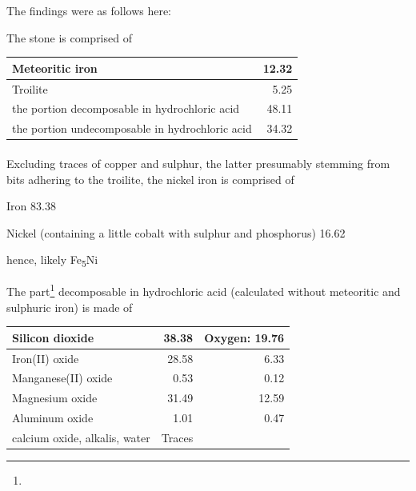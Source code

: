 \documentclass[a4paper, 12pt, oneside]{article}
\begin{document}
The findings were as follows here:

The stone is comprised of
\begin{center}
    \begin{tabular}{ |l|r| } 
    \hline
    Meteoritic iron & 12.32\\\hline
    Troilite & 5.25\\\hline
    the portion decomposable in hydrochloric acid & 48.11\\\hline
    the portion undecomposable in hydrochloric acid & 34.32\\
    \hline
    \end{tabular}
\end{center}
\paragraph*{}
Excluding traces of copper and sulphur, the latter presumably stemming from bits adhering to the troilite, the nickel iron is comprised of

Iron 83.38

Nickel (containing a little cobalt with sulphur and phosphorus) 16.62

hence, likely Fe\textsubscript{5}Ni

The part\footnote{} decomposable in hydrochloric acid (calculated without meteoritic and sulphuric iron) is made of
\begin{center}
    \begin{tabular}{ |l|r|r| } 
    \hline
    Silicon dioxide & 38.38 & Oxygen: 19.76\\\hline
    Iron(II) oxide & 28.58 & 6.33\\\hline
    Manganese(II) oxide & 0.53 & 0.12\\\hline
    Magnesium oxide & 31.49 & 12.59\\\hline
    Aluminum oxide & 1.01 & 0.47\\\hline
    calcium oxide, alkalis, water & Traces &\\
    \hline
    \end{tabular}
\end{center}
\end{document}
